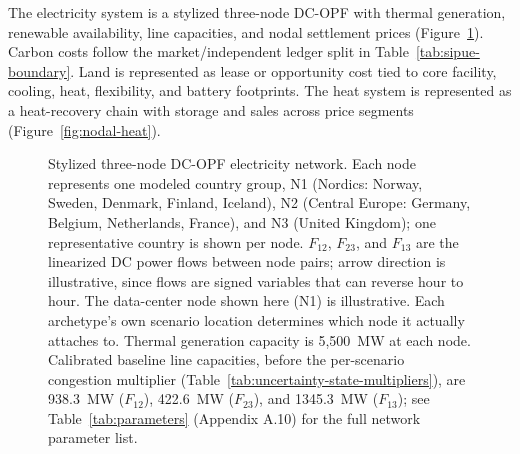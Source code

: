\documentclass[preprint,12pt]{elsarticle}
\begin{document}
The electricity system is a stylized three-node DC-OPF with thermal generation, renewable availability, line capacities, and nodal settlement prices (Figure~\ref{fig:nodal-power}). Carbon costs follow the market/independent ledger split in Table~\ref{tab:sipue-boundary}. Land is represented as lease or opportunity cost tied to core facility, cooling, heat, flexibility, and battery footprints. The heat system is represented as a heat-recovery chain with storage and sales across price segments (Figure~\ref{fig:nodal-heat}).

\begin{figure}[tbp]
\centering
{}
\caption{Stylized three-node DC-OPF electricity network. Each node represents one modeled country group, N1 (Nordics: Norway, Sweden, Denmark, Finland, Iceland), N2 (Central Europe: Germany, Belgium, Netherlands, France), and N3 (United Kingdom); one representative country is shown per node. $F_{12}$, $F_{23}$, and $F_{13}$ are the linearized DC power flows between node pairs; arrow direction is illustrative, since flows are signed variables that can reverse hour to hour. The data-center node shown here (N1) is illustrative. Each archetype's own scenario location determines which node it actually attaches to. Thermal generation capacity is 5,500~MW at each node. Calibrated baseline line capacities, before the per-scenario congestion multiplier (Table~\ref{tab:uncertainty-state-multipliers}), are 938.3~MW ($F_{12}$), 422.6~MW ($F_{23}$), and 1345.3~MW ($F_{13}$); see Table~\ref{tab:parameters} (Appendix A.10) for the full network parameter list.}
\label{fig:nodal-power}
\end{figure}
\end{document}
